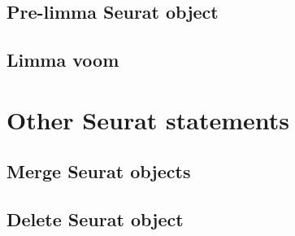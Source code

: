 \subsection{Pre-limma Seurat object}
\subsection{Limma voom}

\section{Other Seurat statements}\label{sec:OtherSeuratStatements}
\subsection{Merge Seurat objects}
\subsection{Delete Seurat object}
